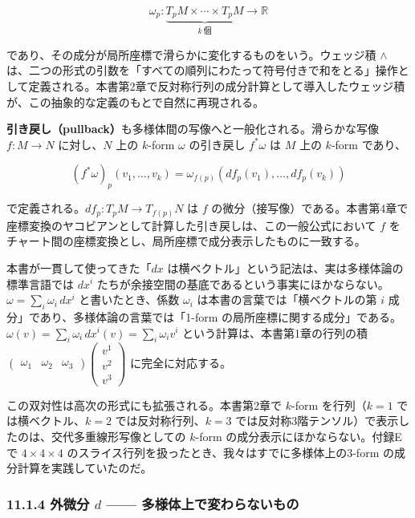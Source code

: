 \documentclass[a4paper,12pt,openany]{book}
\begin{document}
\[\omega_p: \underbrace{T_p M \times \cdots \times T_p M}_{k\ \text{個}} \to \mathbb{R}\]

であり、その成分が局所座標で滑らかに変化するものをいう。ウェッジ積
\(\wedge\)
は、二つの形式の引数を「すべての順列にわたって符号付きで和をとる」操作として定義される。本書第2章で反対称行列の成分計算として導入したウェッジ積が、この抽象的な定義のもとで自然に再現される。

\textbf{引き戻し（pullback）}も多様体間の写像へと一般化される。滑らかな写像
\(f: M \to N\) に対し、\(N\) 上の \(k\)-form \(\omega\) の引き戻し
\(f^*\omega\) は \(M\) 上の \(k\)-form であり、

\[(f^*\omega)_p(v_1, \dots, v_k) = \omega_{f(p)}(df_p(v_1), \dots, df_p(v_k))\]

で定義される。\(df_p: T_p M \to T_{f(p)} N\) は \(f\)
の微分（接写像）である。本書第4章で座標変換のヤコビアンとして計算した引き戻しは、この一般公式において
\(f\) をチャート間の座標変換とし、局所座標で成分表示したものに一致する。

本書が一貫して使ってきた「\(dx\)
は横ベクトル」という記法は、実は多様体論の標準言語では \(dx^i\)
たちが余接空間の基底であるという事実にほかならない。\(\omega = \sum_i \omega_i\,dx^i\)
と書いたとき、係数 \(\omega_i\) は本書の言葉では「横ベクトルの第 \(i\)
成分」であり、多様体論の言葉では「1-form
の局所座標に関する成分」である。\(\omega(v) = \sum_i \omega_i\,dx^i(v) = \sum_i \omega_i v^i\)
という計算は、本書第1章の行列の積
\(\begin{pmatrix}\omega_1&\omega_2&\omega_3\end{pmatrix}\begin{pmatrix}v^1\\v^2\\v^3\end{pmatrix}\)
に完全に対応する。

この双対性は高次の形式にも拡張される。本書第2章で \(k\)-form
を行列（\(k=1\) では横ベクトル、\(k=2\) では反対称行列、\(k=3\)
では反対称3階テンソル）で表示したのは、交代多重線形写像としての
\(k\)-form の成分表示にほかならない。付録Eで \(4\times4\times4\)
のスライス行列を扱ったとき、我々はすでに多様体上の3-form
の成分計算を実践していたのだ。

\hypertarget{ux5916ux5faeux5206-d-ux591aux69d8ux4f53ux4e0aux3067ux5909ux308fux3089ux306aux3044ux3082ux306e}{%
\subsubsection{\texorpdfstring{11.1.4 外微分 \(d\) ——
多様体上で変わらないもの}{11.1.4 外微分 d —— 多様体上で変わらないもの}}\label{ux5916ux5faeux5206-d-ux591aux69d8ux4f53ux4e0aux3067ux5909ux308fux3089ux306aux3044ux3082ux306e}}
\end{document}
